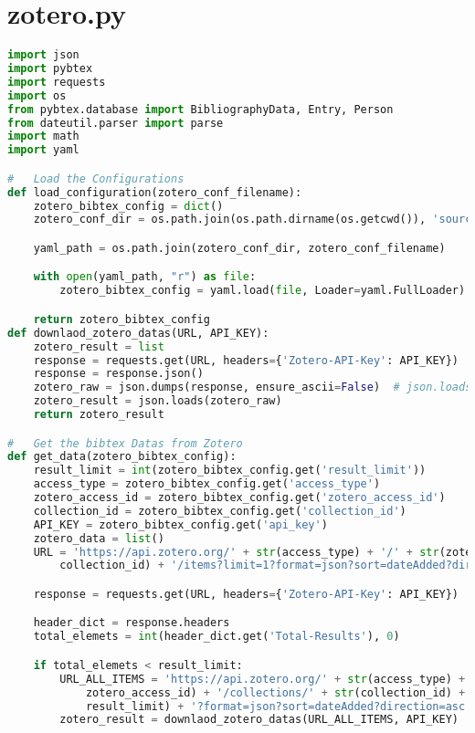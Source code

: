
\section{zotero.py}
\lstset{style=gra_codestyle}
\begin{lstlisting}[language=python, caption=Python LaTex - zotero.py - Zotero BibLaTex Importer,captionpos=b,label={lst:zotero},breaklines=true]
import json
import pybtex
import requests
import os
from pybtex.database import BibliographyData, Entry, Person
from dateutil.parser import parse
import math
import yaml

#   Load the Configurations
def load_configuration(zotero_conf_filename):
    zotero_bibtex_config = dict()
    zotero_conf_dir = os.path.join(os.path.dirname(os.getcwd()), 'source', 'configuration')

    yaml_path = os.path.join(zotero_conf_dir, zotero_conf_filename)

    with open(yaml_path, "r") as file:
        zotero_bibtex_config = yaml.load(file, Loader=yaml.FullLoader)

    return zotero_bibtex_config
def downlaod_zotero_datas(URL, API_KEY):
    zotero_result = list
    response = requests.get(URL, headers={'Zotero-API-Key': API_KEY})
    response = response.json()
    zotero_raw = json.dumps(response, ensure_ascii=False)  # json.loads(response)
    zotero_result = json.loads(zotero_raw)
    return zotero_result

#   Get the bibtex Datas from Zotero
def get_data(zotero_bibtex_config):
    result_limit = int(zotero_bibtex_config.get('result_limit'))
    access_type = zotero_bibtex_config.get('access_type')
    zotero_access_id = zotero_bibtex_config.get('zotero_access_id')
    collection_id = zotero_bibtex_config.get('collection_id')
    API_KEY = zotero_bibtex_config.get('api_key')
    zotero_data = list()
    URL = 'https://api.zotero.org/' + str(access_type) + '/' + str(zotero_access_id) + '/collections/' + str(
        collection_id) + '/items?limit=1?format=json?sort=dateAdded?direction=asc'

    response = requests.get(URL, headers={'Zotero-API-Key': API_KEY})

    header_dict = response.headers
    total_elemets = int(header_dict.get('Total-Results'), 0)

    if total_elemets < result_limit:
        URL_ALL_ITEMS = 'https://api.zotero.org/' + str(access_type) + '/' + str(
            zotero_access_id) + '/collections/' + str(collection_id) + '/items?limit=' + str(
            result_limit) + '?format=json?sort=dateAdded?direction=asc'
        zotero_result = downlaod_zotero_datas(URL_ALL_ITEMS, API_KEY)


\end{lstlisting}
